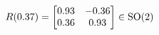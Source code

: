 \documentclass[preview]{standalone}
\begin{document}
\begin{align*}
\special{dvisvgm:raw <g id='unique000'>}R(0.37) = \begin{bmatrix} 0.93 & -0.36 \\ 0.36 & 0.93 \end{bmatrix} \in \text{SO}(2)\special{dvisvgm:raw </g>}
\end{align*}
\end{document}
